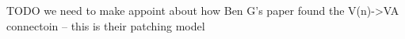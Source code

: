 \documentclass[11pt]{article}
\begin{document}























TODO we need to make appoint about how Ben G's paper found the V(n)->VA connectoin -- this is their patching model
\end{document}
